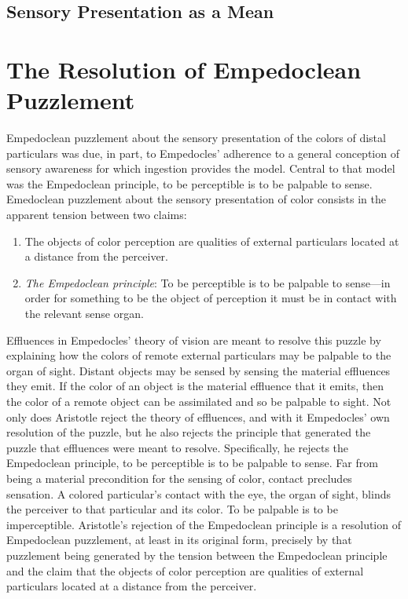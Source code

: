 
\subsection{Sensory Presentation as a Mean} %
\label{sub:sensory_presentation_as_a_mean}



\section{The Resolution of Empedoclean Puzzlement} %
\label{sec:the_resolution_of_empedoclean_puzzlement}

Empedoclean puzzlement about the sensory presentation of the colors of distal particulars was due, in part, to Empedocles' adherence to a general conception of sensory awareness for which ingestion provides the model. Central to that model was the Empedoclean principle, to be perceptible is to be palpable to sense. Emedoclean puzzlement about the sensory presentation of color consists in the apparent tension between two claims:
\begin{enumerate}[(1)]
    \item The objects of color perception are qualities of external particulars located at a distance from the perceiver.
    \item \emph{The Empedoclean principle}: To be perceptible is to be palpable to sense---in order for something to be the object of perception it must be in contact with the relevant sense organ.
\end{enumerate}
Effluences in Empedocles' theory of vision are meant to resolve this puzzle by explaining how the colors of remote external particulars may be palpable to the organ of sight. Distant objects may be sensed by sensing the material effluences they emit. If the color of an object is the material effluence that it emits, then the color of a remote object can be assimilated and so be palpable to sight. Not only does Aristotle reject the theory of effluences, and with it Empedocles' own resolution of the puzzle, but he also rejects the principle that generated the puzzle that effluences were meant to resolve. Specifically, he rejects the Empedoclean principle, to be perceptible is to be palpable to sense. Far from being a material precondition for the sensing of color, contact precludes sensation. A colored particular's contact with the eye, the organ of sight, blinds the perceiver to that particular and its color. To be palpable is to be imperceptible. Aristotle's rejection of the Empedoclean principle is a resolution of Empedoclean puzzlement, at least in its original form, precisely by that puzzlement being generated by the tension between the Empedoclean principle and the claim that the objects of color perception are qualities of external particulars located at a distance from the perceiver.

